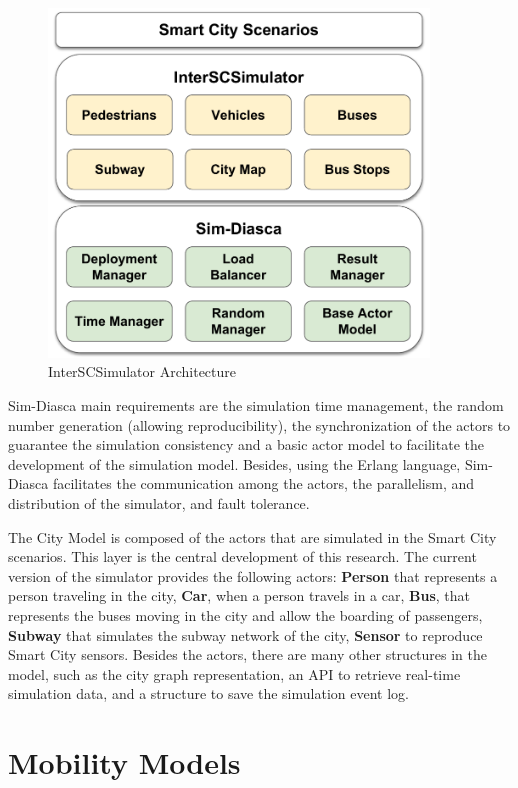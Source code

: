 \begin{figure}[!htb]
\centering
\includegraphics[width=0.9\textwidth]{figuras/chap-interscsimulator/Architecture.pdf}
\caption{InterSCSimulator Architecture}
\label{fig:arquitetura}
\end{figure}

Sim-Diasca main requirements are the simulation time management, the random number generation (allowing reproducibility), the synchronization of the actors to guarantee the simulation consistency and a basic actor model to facilitate the development of the simulation model. Besides, using the Erlang language, Sim-Diasca facilitates the communication among the actors, the parallelism, and distribution of the simulator, and fault tolerance.

The City Model is composed of the actors that are simulated in the Smart City scenarios. This layer is the central development of this research. The current version of the simulator provides the following actors: \textbf{Person} that represents a person traveling in the city, \textbf{Car}, when a person travels in a car, \textbf{Bus}, that represents the buses moving in the city and allow the boarding of passengers, \textbf{Subway} that simulates the subway network of the city, \textbf{Sensor} to reproduce Smart City sensors. Besides the actors, there are many other structures in the model, such as the city graph representation, an API to retrieve real-time simulation data, and a structure to save the simulation event log.

\section{Mobility Models}
\label{sub:modelo}

